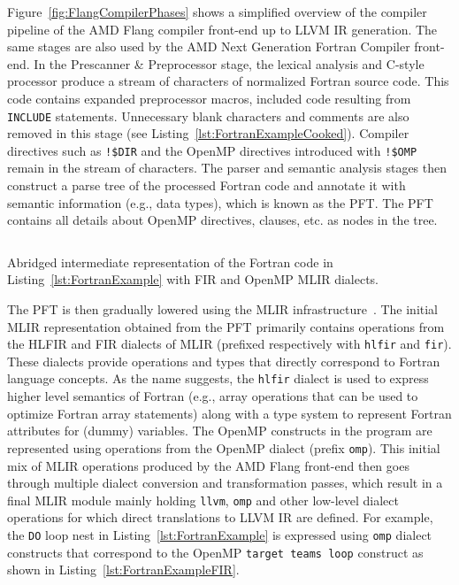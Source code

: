 \documentclass[acmtog,natbib=false]{acmart}
\newcommand{\code}[1]{\texttt{#1}\xspace}
\begin{document}
Figure~\ref{fig:FlangCompilerPhases} shows a simplified overview of the compiler pipeline of the AMD Flang compiler front-end up to LLVM \ac{IR} generation.
The same stages are also used by the AMD Next Generation Fortran Compiler front-end.
In the Prescanner \& Preprocessor stage, the lexical analysis and C-style processor produce a stream of characters of normalized Fortran source code. 
This code contains expanded preprocessor macros, included code resulting from \code{INCLUDE} statements. Unnecessary blank characters and comments are also removed in this stage (see Listing~\ref{lst:FortranExampleCooked}).
Compiler directives such as \code{!\$DIR} and the OpenMP directives introduced with \code{!\$OMP} remain in the stream of characters.
The parser and semantic analysis stages then construct a parse tree of the processed Fortran code and annotate it with semantic information (e.g., data types), which is known as the \ac{PFT}.
The \ac{PFT} contains all details about OpenMP directives, clauses, etc. as nodes in the tree.

\begin{listing}[t]
\inputminted{MLIR-lexer.py:MlirLexer -x}{code/tgt_loop_abridged.fir}
\caption{Abridged intermediate representation of the Fortran code in Listing~\ref{lst:FortranExample} with \acs{FIR} and OpenMP \acs{MLIR} dialects.}
\label{lst:FortranExampleFIR}
\end{listing}


The \ac{PFT} is then gradually lowered using the \ac{MLIR} infrastructure~\cite{mlir}. The initial \ac{MLIR} representation obtained from the \ac{PFT} primarily contains operations from the \ac{HLFIR} and \ac{FIR} dialects of \ac{MLIR} (prefixed respectively with \code{hlfir} and \code{fir}).
These dialects provide operations and types that directly correspond to Fortran language concepts.
As the name suggests, the \code{hlfir} dialect is used to express higher level semantics of Fortran (e.g., array operations that can be used to optimize Fortran array statements) along with a type system to represent Fortran attributes for (dummy) variables.
The OpenMP constructs in the program are represented using operations from the OpenMP dialect (prefix \code{omp}).
This initial mix of \ac{MLIR} operations produced by the AMD Flang front-end then goes through multiple dialect conversion and transformation passes, which result in a final \ac{MLIR} module mainly holding \code{llvm}, \code{omp} and other low-level dialect operations for which direct translations to LLVM \ac{IR} are defined.
For example, the \code{DO} loop nest in Listing~\ref{lst:FortranExample} is expressed using \code{omp} dialect constructs that correspond to the OpenMP \code{target teams loop} construct as shown in Listing~\ref{lst:FortranExampleFIR}.
\end{document}
